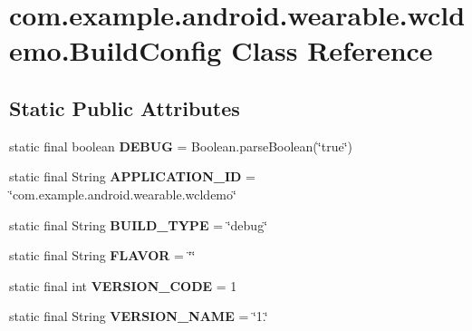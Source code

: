 \hypertarget{classcom_1_1example_1_1android_1_1wearable_1_1wcldemo_1_1BuildConfig}{}\section{com.\+example.\+android.\+wearable.\+wcldemo.\+Build\+Config Class Reference}
\label{classcom_1_1example_1_1android_1_1wearable_1_1wcldemo_1_1BuildConfig}
\subsection*{Static Public Attributes}
\begin{DoxyCompactItemize}
\item 
static final boolean {\bfseries D\+E\+B\+UG} = Boolean.\+parse\+Boolean(\char`\"{}true\char`\"{})\hypertarget{classcom_1_1example_1_1android_1_1wearable_1_1wcldemo_1_1BuildConfig_a2cdec59938e02d055de2cf8cab9cfba6}{}\label{classcom_1_1example_1_1android_1_1wearable_1_1wcldemo_1_1BuildConfig_a2cdec59938e02d055de2cf8cab9cfba6}

\item 
static final String {\bfseries A\+P\+P\+L\+I\+C\+A\+T\+I\+O\+N\+\_\+\+ID} = \char`\"{}com.\+example.\+android.\+wearable.\+wcldemo\char`\"{}\hypertarget{classcom_1_1example_1_1android_1_1wearable_1_1wcldemo_1_1BuildConfig_ac74870a3e0d17163065dda8581126965}{}\label{classcom_1_1example_1_1android_1_1wearable_1_1wcldemo_1_1BuildConfig_ac74870a3e0d17163065dda8581126965}

\item 
static final String {\bfseries B\+U\+I\+L\+D\+\_\+\+T\+Y\+PE} = \char`\"{}debug\char`\"{}\hypertarget{classcom_1_1example_1_1android_1_1wearable_1_1wcldemo_1_1BuildConfig_a7fbf048dde87eb8bfa3327c79fb53fa1}{}\label{classcom_1_1example_1_1android_1_1wearable_1_1wcldemo_1_1BuildConfig_a7fbf048dde87eb8bfa3327c79fb53fa1}

\item 
static final String {\bfseries F\+L\+A\+V\+OR} = \char`\"{}\char`\"{}\hypertarget{classcom_1_1example_1_1android_1_1wearable_1_1wcldemo_1_1BuildConfig_afe68ef347bf67cf9f54203cc91dae92e}{}\label{classcom_1_1example_1_1android_1_1wearable_1_1wcldemo_1_1BuildConfig_afe68ef347bf67cf9f54203cc91dae92e}

\item 
static final int {\bfseries V\+E\+R\+S\+I\+O\+N\+\_\+\+C\+O\+DE} = 1\hypertarget{classcom_1_1example_1_1android_1_1wearable_1_1wcldemo_1_1BuildConfig_a2b08dd255a7193d4e022cb5a74034119}{}\label{classcom_1_1example_1_1android_1_1wearable_1_1wcldemo_1_1BuildConfig_a2b08dd255a7193d4e022cb5a74034119}

\item 
static final String {\bfseries V\+E\+R\+S\+I\+O\+N\+\_\+\+N\+A\+ME} = \char`\"{}1.\char`\"{}\hypertarget{classcom_1_1example_1_1android_1_1wearable_1_1wcldemo_1_1BuildConfig_a202269c366b70db268bfcadf13e108a2}{}\label{classcom_1_1example_1_1android_1_1wearable_1_1wcldemo_1_1BuildConfig_a202269c366b70db268bfcadf13e108a2}

\end{DoxyCompactItemize}


